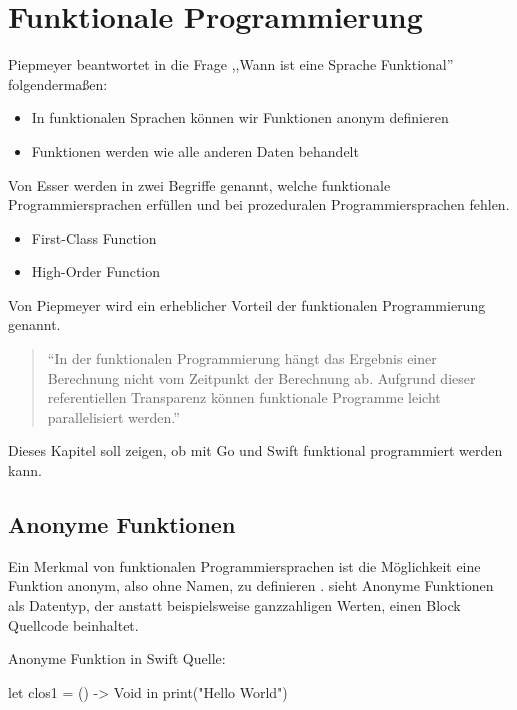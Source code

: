 \chapter{Funktionale Programmierung}
Piepmeyer beantwortet in \cite[S.6]{Piepmeyer.2010} die Frage ,,Wann ist eine Sprache Funktional'' folgendermaßen:

\begin{itemize}
    \item In funktionalen Sprachen können wir Funktionen anonym definieren
    \item Funktionen werden wie alle anderen Daten behandelt
\end{itemize}

Von Esser werden in \cite[S.243]{Esser.2011} zwei Begriffe genannt, welche funktionale Programmiersprachen erfüllen und bei prozeduralen Programmiersprachen fehlen.

\begin{itemize}
    \item First-Class Function
    \item High-Order Function
\end{itemize}

Von Piepmeyer wird ein erheblicher Vorteil der funktionalen Programmierung genannt.

\begin{quote}
\enquote{In der funktionalen Programmierung hängt das Ergebnis einer Berechnung nicht vom Zeitpunkt der Berechnung ab. Aufgrund dieser referentiellen Transparenz können funktionale Programme leicht parallelisiert werden.} \cite[S.13]{Piepmeyer.2010}
\end{quote}

Dieses Kapitel soll zeigen, ob mit Go und Swift funktional programmiert werden kann. 

\section{Anonyme Funktionen}
Ein Merkmal von funktionalen Programmiersprachen ist die Möglichkeit eine Funktion anonym, also ohne Namen, zu definieren \cite[S.28]{Piepmeyer.2010}.
\cite[S.219]{Hoffman.2017} sieht Anonyme Funktionen als Datentyp, der anstatt beispielsweise ganzzahligen Werten, einen Block Quellcode beinhaltet.

\begin{listing}[H]
\caption{Anonyme Funktion in Swift Quelle: \cite[S.220]{Hoffman.2017}}
\label{lst:SwiftClosure}
\begin{SwiftCode}
let clos1 = {
    () -> Void in
    print("Hello World")
}
\end{SwiftCode}
\end{listing}

